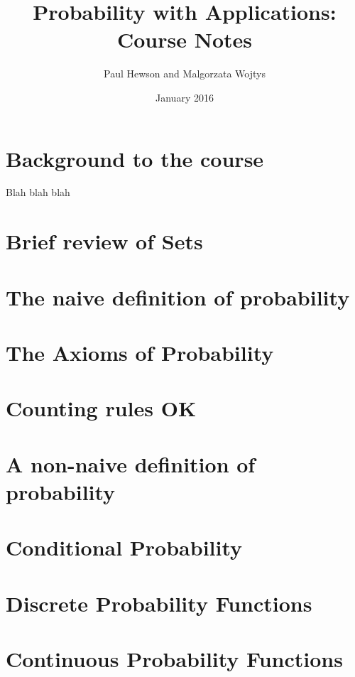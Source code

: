 \documentclass{book}
\title{Probability with Applications: Course Notes}
\author{Paul Hewson and Malgorzata Wojtys}
\date{January 2016}
\begin{document}
\sffamily
\onehalfspacing

\maketitle

\chapter{Background to the course}

Blah blah blah

\chapter{Brief review of Sets}

\chapter{The naive definition of probability}

\chapter{The Axioms of Probability}

\chapter{Counting rules OK}

\chapter{A non-naive definition of probability}

\chapter{Conditional Probability}

\chapter{Discrete Probability Functions}

\chapter{Continuous Probability Functions}
\end{document}
